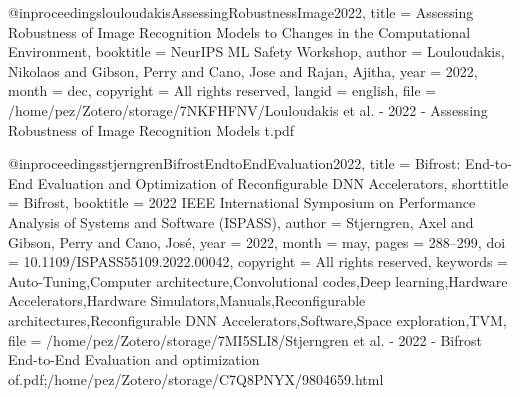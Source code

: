 @inproceedings{louloudakisAssessingRobustnessImage2022,
  title = {Assessing {{Robustness}} of {{Image Recognition Models}} to {{Changes}} in the {{Computational Environment}}},
  booktitle = {{{NeurIPS ML Safety Workshop}}},
  author = {Louloudakis, Nikolaos and Gibson, Perry and Cano, Jose and Rajan, Ajitha},
  year = {2022},
  month = dec,
  copyright = {All rights reserved},
  langid = {english},
  file = {/home/pez/Zotero/storage/7NKFHFNV/Louloudakis et al. - 2022 - Assessing Robustness of Image Recognition Models t.pdf}
}

@inproceedings{stjerngrenBifrostEndtoEndEvaluation2022,
  title = {Bifrost: {{End-to-End Evaluation}} and Optimization of {{Reconfigurable DNN Accelerators}}},
  shorttitle = {Bifrost},
  booktitle = {2022 {{IEEE International Symposium}} on {{Performance Analysis}} of {{Systems}} and {{Software}} ({{ISPASS}})},
  author = {Stjerngren, Axel and Gibson, Perry and Cano, Jos{\'e}},
  year = {2022},
  month = may,
  pages = {288--299},
  doi = {10.1109/ISPASS55109.2022.00042},
  copyright = {All rights reserved},
  keywords = {Auto-Tuning,Computer architecture,Convolutional codes,Deep learning,Hardware Accelerators,Hardware Simulators,Manuals,Reconfigurable architectures,Reconfigurable DNN Accelerators,Software,Space exploration,TVM},
  file = {/home/pez/Zotero/storage/7MI5SLI8/Stjerngren et al. - 2022 - Bifrost End-to-End Evaluation and optimization of.pdf;/home/pez/Zotero/storage/C7Q8PNYX/9804659.html}
}
